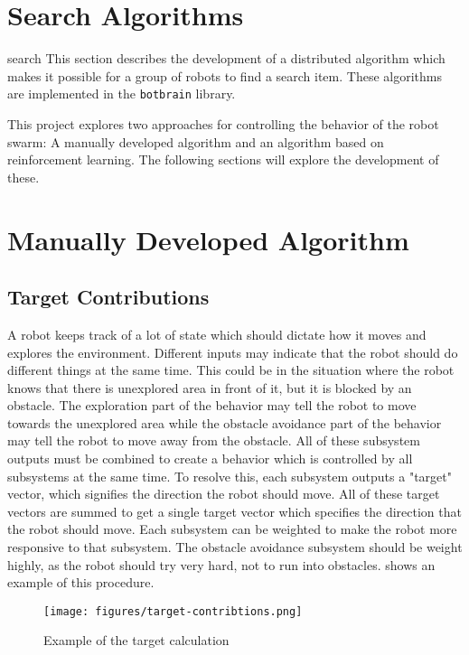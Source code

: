 \section{Search Algorithms}search
This section describes the development of a distributed algorithm which makes it possible for a group of robots to find a search item. These algorithms are implemented in the \texttt{botbrain} library.

This project explores two approaches for controlling the behavior of the robot swarm: A {\color{red} manually developed} algorithm and an algorithm based on reinforcement learning. The following sections will explore the development of these.

\section{{\color{red}Manually Developed Algorithm}}

\subsection{Target Contributions}
A robot keeps track of a lot of state which should dictate how it moves and explores the environment. Different inputs may indicate that the robot should do different things at the same time. This could be in the situation where the robot knows that there is unexplored area in front of it, but it is blocked by an obstacle. The exploration part of the behavior may tell the robot to move towards the unexplored area while the obstacle avoidance part of the behavior may {\color{red} tell} the robot to move away from the obstacle. All of these subsystem outputs must be combined to create a behavior which is {\color{red} controlled by all subsystems at the same time}. To resolve this, each subsystem outputs a "target" vector, which signifies the direction the robot should move. All of these target vectors are summed to get a single target vector which specifies the direction that the robot should move. Each subsystem can be weighted to make the robot more responsive to that subsystem. The obstacle avoidance subsystem should be weight highly, as the robot should try very hard, not to run into obstacles.  shows an example of this procedure.

\begin{figure}[H]
    \begin{center}
        \texttt{[image: figures/target-contribtions.png]}
    \end{center}
    \caption{Example of the target calculation}
    \label{fig:target-contributions}
\end{figure}


